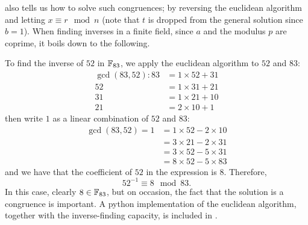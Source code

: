  also tells us how to solve such congruences; by reversing the euclidean algorithm and letting $x \equiv r \mod n$ (note that $t$ is dropped from the general solution since $b = 1$). %
When finding inverses in a finite field, since $a$ and the modulus $p$ are coprime, it boils down to the following.

To find the inverse of $52$ in $\fp[83]$, we apply the euclidean algorithm to $52$ and $83$:
\begin{align*}
	\gcd(83,52): 83 &= 1 \times 52 + 31\\
	52 &= 1 \times 31 + 21\\
	31 &= 1 \times 21 + 10\\
	21 &= 2 \times 10 + 1
\end{align*}
then write $1$ as a linear combination of $52$ and $83$:
\begin{align*}
	\gcd(83,52) = 1 &= 1 \times 52 - 2 \times 10 \\
	&= 3 \times 21 - 2 \times 31 \\
	&= 3 \times 52 - 5 \times 31 \\
	&= 8 \times 52 - 5 \times 83 
\end{align*}
and we have that the coefficient of $52$ in the expression is $8$. Therefore,
$$52^{-1} \equiv 8 \mod 83.$$
In this case, clearly $8 \in \fp[83]$, but on occasion, the fact that the solution is a congruence is important.
A python implementation of the euclidean algorithm, together with the inverse-finding capacity, is included in .
